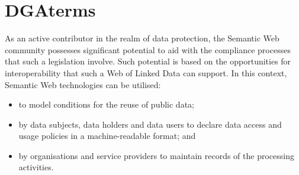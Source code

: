 \section{DGAterms}
\label{sec:dgaterms}

As an active contributor in the realm of data protection, the Semantic Web community possesses significant potential to aid with the compliance processes that such a legislation involve.
Such potential is based on the opportunities for interoperability that such a Web of Linked Data can support.
In this context, Semantic Web technologies can be utilised:
\begin{itemize}
    \item to model conditions for the reuse of public data;
    \item by data subjects, data holders and data users to declare data access and usage policies in a machine-readable format; and
    \item by organisations and service providers to maintain records of the processing activities.
\end{itemize}

